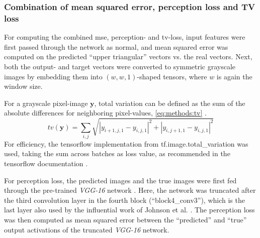 \subsubsection{Combination of mean squared error, perception loss and TV loss} \label{sec:methods:combined_loss}
For computing the combined \acrshort{mse}, perception- and \acrshort{tv}-loss,
input features were first passed through the network as normal,
and mean squared error was computed on the predicted ``upper triangular'' vectors vs. the real vectors.
Next, both the output- and target vectors were converted to symmetric grayscale images by embedding them into 
$(w, w, 1)$-shaped tensors, where $w$ is again the window size.

For a grayscale pixel-image $\mathbf{y}$, total variation can be defined as the sum of the absolute differences for neighboring pixel-values, \cref{eq:methods:tv} \cite{Rudin1992, wikiTV2021}.
\begin{equation}
 tv(\mathbf{y}) = \sum_{i,j}\sqrt{|y_{i+1,j,1} - y_{i,j,1}|^2 + |y_{i,j+1,1} - y_{i,j,1} |^2 } \label{eq:methods:tv}
\end{equation}
For efficiency, the tensorflow implementation from tf.image.total\_variation was used,
taking the sum across batches as loss value, as recommended in the tensorflow documentation \cite{TensorflowTV2020}.

For perception loss, the predicted images and the true images were first fed through the pre-trained \emph{VGG-16} network \cite{Simonyan2015}.
Here, the network was truncated after the third convolution layer in the fourth block (``block4\_conv3''), which is the last layer also used by the influential work of Johnson et al. \cite{Johnson2016}.
The perception loss was then computed as mean squared error between the ``predicted'' and ``true'' output activations of the truncated \emph{VGG-16} network.

